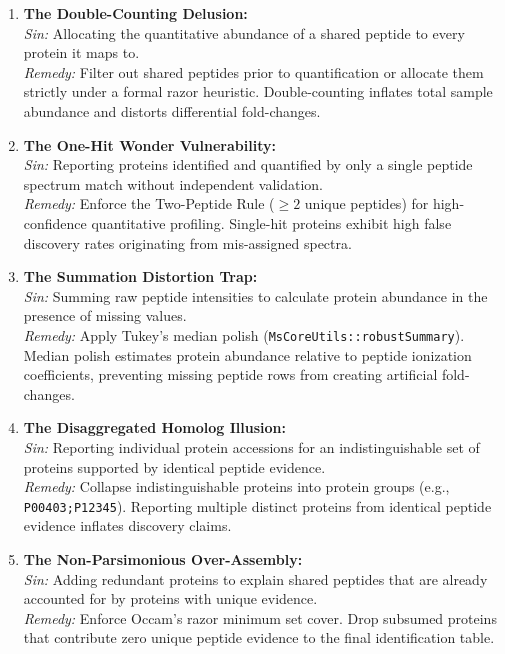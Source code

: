 \documentclass[11pt,twoside,openright]{book}
\begin{document}
\begin{enumerate}
    \item \textbf{The Double-Counting Delusion:}\\
    \textit{Sin:} Allocating the quantitative abundance of a shared peptide to every protein it maps to.\\
    \textit{Remedy:} Filter out shared peptides prior to quantification or allocate them strictly under a formal razor heuristic. Double-counting inflates total sample abundance and distorts differential fold-changes.

    \item \textbf{The One-Hit Wonder Vulnerability:}\\
    \textit{Sin:} Reporting proteins identified and quantified by only a single peptide spectrum match without independent validation.\\
    \textit{Remedy:} Enforce the Two-Peptide Rule ($\ge 2$ unique peptides) for high-confidence quantitative profiling. Single-hit proteins exhibit high false discovery rates originating from mis-assigned spectra.

    \item \textbf{The Summation Distortion Trap:}\\
    \textit{Sin:} Summing raw peptide intensities to calculate protein abundance in the presence of missing values.\\
    \textit{Remedy:} Apply Tukey's median polish (\texttt{MsCoreUtils::robustSummary}). Median polish estimates protein abundance relative to peptide ionization coefficients, preventing missing peptide rows from creating artificial fold-changes.

    \item \textbf{The Disaggregated Homolog Illusion:}\\
    \textit{Sin:} Reporting individual protein accessions for an indistinguishable set of proteins supported by identical peptide evidence.\\
    \textit{Remedy:} Collapse indistinguishable proteins into protein groups (e.g., \texttt{P00403;P12345}). Reporting multiple distinct proteins from identical peptide evidence inflates discovery claims.

    \item \textbf{The Non-Parsimonious Over-Assembly:}\\
    \textit{Sin:} Adding redundant proteins to explain shared peptides that are already accounted for by proteins with unique evidence.\\
    \textit{Remedy:} Enforce Occam's razor minimum set cover. Drop subsumed proteins that contribute zero unique peptide evidence to the final identification table.
\end{enumerate}
\end{document}
